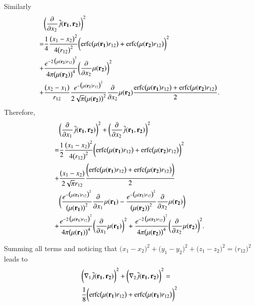 \documentclass[aip,jcp,reprint,noshowkeys,superscriptaddress]{revtex4-1}
\newcommand{\deriv}[3]{\frac{\partial^{#3} #1}{\partial {#2}^{#3}}}
\newcommand{\bd}[1]{{\bf {#1}}}
\newcommand{\mur}[1]{\mu({\bf r_{#1}})}
\begin{document}
Similarly 
\begin{equation}
 \begin{aligned}
& \bigg(\deriv{}{x_2}{}\tilde{j}(\bd{r_1},\bd{r_2}) \bigg)^2  \\
 = & \frac{1}{4}\frac{\big( x_1 - x_2 \big)^2}{4 \big(r_{12}\big)^2} \bigg(\text{erfc}\big(\mur{1} r_{12}\big) + \text{erfc}\big(\mur{2} r_{12}\big) \bigg)^2  \\
 + & \frac{e^{-2 \,\big(\mur{2}r_{12} \big)^2}}{4\pi \big(\mur{2}\big)^4} \bigg( \deriv{}{x_2}{}\mur{2} \bigg)^2 \\
 + & \frac{\big(x_2 - x_1\big)}{r_{12}} \frac{e^{-\big(\mur{2} r_{12}\big)^2}}{2\sqrt{\pi} \big(\mur{2}\big)^2} \deriv{}{x_2}{}\mur{2} 
 \frac{\text{erfc}\big(\mur{1} r_{12}\big) + \text{erfc}\big(\mur{2} r_{12}\big)}{2}.
 \end{aligned}
\end{equation}
Therefore, 
\begin{equation}
 \begin{aligned}
& \bigg(\deriv{}{x_1}{}\tilde{j}(\bd{r_1},\bd{r_2}) \bigg)^2 + \bigg(\deriv{}{x_2}{}\tilde{j}(\bd{r_1},\bd{r_2}) \bigg)^2  \\
 = & \frac{1}{2}\frac{\big( x_1 - x_2 \big)^2}{4 \big(r_{12}\big)^2} \bigg(\text{erfc}\big(\mur{1} r_{12}\big) + \text{erfc}\big(\mur{2} r_{12}\big) \bigg)^2  \\
 + & \frac{\big(x_1 - x_2\big)}{2 \sqrt{\pi}r_{12}}  \frac{\bigg(\text{erfc}\big(\mur{1} r_{12}\big) + \text{erfc}\big(\mur{2} r_{12}\big) \bigg)}{2} \\
&\bigg(   \frac{e^{-\big(\mur{1} r_{12}\big)^2}}{\big(\mur{1}\big)^2} \deriv{}{x_1}{}\mur{1} 
- \frac{e^{-\big(\mur{2} r_{12}\big)^2}}{\big(\mur{2}\big)^2} \deriv{}{x_2}{}\mur{2} \bigg) \\
 + & \frac{e^{-2 \,\big(\mur{1}r_{12} \big)^2}}{4\pi \big(\mur{1}\big)^4} \bigg( \deriv{}{x_1}{}\mur{1} \bigg)^2 
 + \frac{e^{-2 \,\big(\mur{2}r_{12} \big)^2}}{4\pi \big(\mur{2}\big)^4} \bigg( \deriv{}{x_2}{}\mur{2} \bigg)^2.
 \end{aligned}
\end{equation}

Summing all terms and noticing that $\bigg(x_1 - x_2\bigg)^2 + \bigg(y_1 - y_2\bigg)^2 + \bigg(z_1 - z_2\bigg)^2 = \bigg(r_{12}\bigg)^2$ leads to 
\begin{equation}
 \begin{aligned}
& \bigg(\nabla_1\tilde{j}(\bd{r_1},\bd{r_2})\bigg)^2 + \bigg(\nabla_2\tilde{j}(\bd{r_1},\bd{r_2})\bigg)^2 = \\
& \frac{1}{8}\bigg(\text{erfc}\big(\mur{1} r_{12}\big) + \text{erfc}\big(\mur{1} r_{12}\big) \bigg)^2 
 \end{aligned}
\end{equation}
\end{document}
